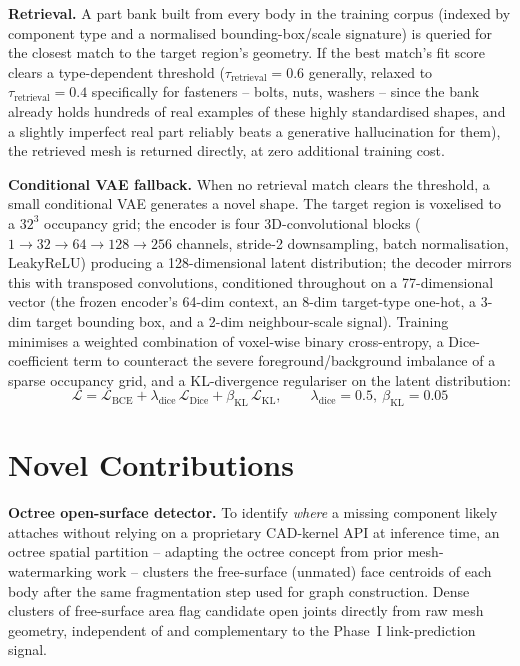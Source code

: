 \documentclass[sn-mathphys,Numbered]{sn-jnl}
\begin{document}
\textbf{Retrieval.} A part bank built from every body in the training corpus (indexed by component type and a normalised bounding-box/scale signature) is queried for the closest match to the target region's geometry. If the best match's fit score clears a type-dependent threshold ($\tau_{\text{retrieval}}=0.6$ generally, relaxed to $\tau_{\text{retrieval}}=0.4$ specifically for fasteners -- bolts, nuts, washers -- since the bank already holds hundreds of real examples of these highly standardised shapes, and a slightly imperfect real part reliably beats a generative hallucination for them), the retrieved mesh is returned directly, at zero additional training cost.

\textbf{Conditional VAE fallback.} When no retrieval match clears the threshold, a small conditional VAE generates a novel shape. The target region is voxelised to a $32^3$ occupancy grid; the encoder is four 3D-convolutional blocks ($1\!\to\!32\!\to\!64\!\to\!128\!\to\!256$ channels, stride-2 downsampling, batch normalisation, LeakyReLU) producing a 128-dimensional latent distribution; the decoder mirrors this with transposed convolutions, conditioned throughout on a 77-dimensional vector (the frozen encoder's 64-dim context, an 8-dim target-type one-hot, a 3-dim target bounding box, and a 2-dim neighbour-scale signal). Training minimises a weighted combination of voxel-wise binary cross-entropy, a Dice-coefficient term to counteract the severe foreground/background imbalance of a sparse occupancy grid, and a KL-divergence regulariser on the latent distribution:
\begin{equation}
\mathcal{L} = \mathcal{L}_{\text{BCE}} + \lambda_{\text{dice}}\,\mathcal{L}_{\text{Dice}} + \beta_{\text{KL}}\,\mathcal{L}_{\text{KL}}, \qquad \lambda_{\text{dice}}=0.5,\ \beta_{\text{KL}}=0.05
\label{eq:vaeloss}
\end{equation}

\section{Novel Contributions}\label{sec:novel}

\textbf{Octree open-surface detector.} To identify \emph{where} a missing component likely attaches without relying on a proprietary CAD-kernel API at inference time, an octree spatial partition -- adapting the octree concept from prior mesh-watermarking work \cite{borah2020watermark} -- clusters the free-surface (unmated) face centroids of each body after the same fragmentation step used for graph construction. Dense clusters of free-surface area flag candidate open joints directly from raw mesh geometry, independent of and complementary to the Phase~I link-prediction signal.
\end{document}
